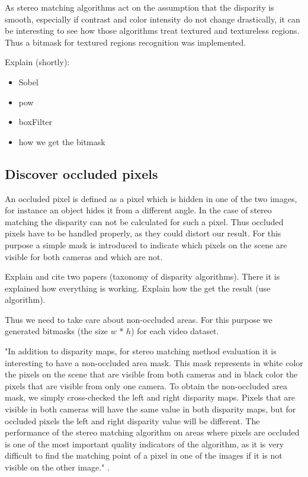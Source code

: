 As stereo matching algorithms act on the assumption that the disparity is smooth, especially if contrast and color intensity do not change drastically, it can be interesting to see how those algorithms treat textured and textureless regions.
Thus a bitmask for textured regions recognition was implemented.

Explain (shortly):

\begin{itemize}
  \item Sobel
  \item pow
  \item boxFilter
  \item how we get the bitmask
\end{itemize}

\subsection*{Discover occluded pixels}

An occluded pixel is defined as a pixel which is hidden in one of the two images, for instance an object hides it from a different angle.
In the case of stereo matching the disparity can not be calculated for such a pixel.
Thus occluded pixels have to be handled properly, as they could distort our result.
For this purpose a simple mask is introduced to indicate which pixels on the scene are visible for both cameras and which are not.

Explain and cite two papers (taxonomy of disparity algorithms).
There it is explained how everything is working.
Explain how the get the result (use algorithm).

Thus we need to take care about non-occluded areas. For this purpose we generated bitmasks (the size $w$ * $h$) for each video dataset.

"In addition to disparity maps, for stereo matching method evaluation it is interesting to have a non-occluded area mask. This mask represents in white color the pixels on the scene that are visible from both cameras and in black color the pixels that are visible from only one camera.
To obtain the non-occluded area mask, we simply cross-checked the left and right disparity maps. Pixels that are visible in both cameras will have the same value in both disparity maps, but for occluded pixels the left and right disparity value will be different.
The performance of the stereo matching algorithm on areas where pixels are occluded is one of the most important quality indicators of the algorithm, as it is very difficult to find the matching point of a pixel in one of the images if it is not visible on the other image." \citep{martull2012realistic}.

